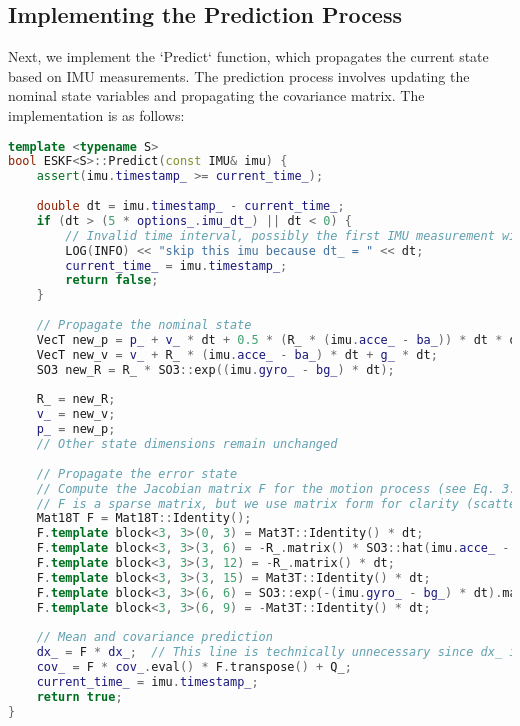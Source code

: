 \subsection{Implementing the Prediction Process}  

Next, we implement the `Predict` function, which propagates the current state based on IMU measurements. The prediction process involves updating the nominal state variables and propagating the covariance matrix. The implementation is as follows:  

\begin{lstlisting}[language=c++,caption=src/ch3/eskf.hpp]
template <typename S>
bool ESKF<S>::Predict(const IMU& imu) {
	assert(imu.timestamp_ >= current_time_);
	
	double dt = imu.timestamp_ - current_time_;
	if (dt > (5 * options_.imu_dt_) || dt < 0) {
		// Invalid time interval, possibly the first IMU measurement with no prior information
		LOG(INFO) << "skip this imu because dt_ = " << dt;
		current_time_ = imu.timestamp_;
		return false;
	}
	
	// Propagate the nominal state
	VecT new_p = p_ + v_ * dt + 0.5 * (R_ * (imu.acce_ - ba_)) * dt * dt + 0.5 * g_ * dt * dt;
	VecT new_v = v_ + R_ * (imu.acce_ - ba_) * dt + g_ * dt;
	SO3 new_R = R_ * SO3::exp((imu.gyro_ - bg_) * dt);
	
	R_ = new_R;
	v_ = new_v;
	p_ = new_p;
	// Other state dimensions remain unchanged
	
	// Propagate the error state
	// Compute the Jacobian matrix F for the motion process (see Eq. 3.47)
	// F is a sparse matrix, but we use matrix form for clarity (scattered computation is also possible for efficiency)
	Mat18T F = Mat18T::Identity();                                                 // Main diagonal
	F.template block<3, 3>(0, 3) = Mat3T::Identity() * dt;                         // p wrt v
	F.template block<3, 3>(3, 6) = -R_.matrix() * SO3::hat(imu.acce_ - ba_) * dt;  // v wrt theta
	F.template block<3, 3>(3, 12) = -R_.matrix() * dt;                             // v wrt ba
	F.template block<3, 3>(3, 15) = Mat3T::Identity() * dt;                        // v wrt g
	F.template block<3, 3>(6, 6) = SO3::exp(-(imu.gyro_ - bg_) * dt).matrix();     // theta wrt theta
	F.template block<3, 3>(6, 9) = -Mat3T::Identity() * dt;                        // theta wrt bg
	
	// Mean and covariance prediction
	dx_ = F * dx_;  // This line is technically unnecessary since dx_ is reset to zero after updates, but F is needed for covariance propagation
	cov_ = F * cov_.eval() * F.transpose() + Q_;
	current_time_ = imu.timestamp_;
	return true;
}
\end{lstlisting}  

